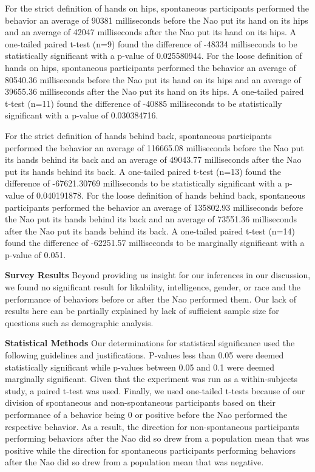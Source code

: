\documentclass{acm_proc_article-sp}
\begin{document}
For the strict definition of hands on hips, spontaneous participants performed the behavior an average of 90381 milliseconds before the Nao put its hand on its hips and an average of 42047 milliseconds after the Nao put its hand on its hips. A one-tailed paired t-test (n=9) found the difference of -48334 milliseconds to be statistically significant with a p-value of 0.025580944. For the loose definition of hands on hips, spontaneous participants performed the behavior an average of 80540.36 milliseconds before the Nao put its hand on its hips and an average of 39655.36 milliseconds after the Nao put its hand on its hips. A one-tailed paired t-test (n=11) found the difference of -40885 milliseconds to be statistically significant with a p-value of 0.030384716.

For the strict definition of hands behind back, spontaneous participants performed the behavior an average of 116665.08 milliseconds before the Nao put its hands behind its back and an average of 49043.77 milliseconds after the Nao put its hands behind its back. A one-tailed paired t-test (n=13) found the difference of -67621.30769 milliseconds to be statistically significant with a p-value of 0.040191878. For the loose definition of hands behind back, spontaneous participants performed the behavior an average of 135802.93 milliseconds before the Nao put its hands behind its back and an average of 73551.36 milliseconds after the Nao put its hands behind its back. A one-tailed paired t-test (n=14) found the difference of -62251.57 milliseconds to be marginally significant with a p-value of 0.051.

\textbf{Survey Results} Beyond providing us insight for our inferences in our discussion, we found no significant result for likability, intelligence, gender, or race and the performance of behaviors before or after the Nao performed them. Our lack of results here can be partially explained by lack of sufficient sample size for questions such as demographic analysis.

\textbf{Statistical Methods} Our determinations for statistical significance used the following guidelines and justifications. P-values less than 0.05 were deemed statistically significant while p-values between 0.05 and 0.1 were deemed marginally significant. Given that the experiment was run as a within-subjects study, a paired t-test was used. Finally, we used one-tailed t-tests because of our division of spontaneous and non-spontaneous participants based on their performance of a behavior being 0 or positive before the Nao performed the respective behavior. As a result, the direction for non-spontaneous participants performing behaviors after the Nao did so drew from a population mean that was positive while the direction for spontaneous participants performing behaviors after the Nao did so drew from a population mean that was negative.
\end{document}
